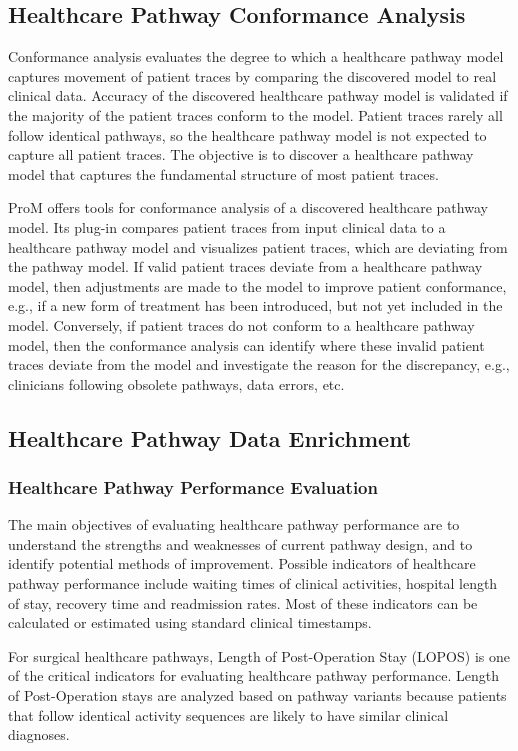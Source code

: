 \subsection{Healthcare Pathway Conformance Analysis}
Conformance analysis evaluates the degree to which a healthcare pathway model captures movement of patient traces by comparing the discovered model to real clinical data. 
Accuracy of the discovered healthcare pathway model is validated if the majority of the patient traces conform to the model. Patient traces rarely all follow identical pathways, so the healthcare pathway model is not expected to capture all patient traces. The objective is to discover a healthcare pathway model that captures the fundamental structure of most patient traces. 

ProM offers tools for conformance analysis of a discovered healthcare pathway model. Its plug-in  compares patient traces from input clinical data to a healthcare pathway model and visualizes patient traces, which are deviating from the pathway model. If valid patient traces deviate from a healthcare pathway model, then adjustments are made to the model to improve patient conformance, e.g., if a new form of treatment has been introduced, but not yet included in the model. Conversely, if patient traces do not conform to a healthcare pathway model, then the conformance analysis can identify where these invalid patient traces deviate from the model and investigate the reason for the discrepancy, e.g., clinicians following obsolete pathways, data errors, etc.

\subsection{Healthcare Pathway Data Enrichment}
\subsubsection{Healthcare Pathway Performance Evaluation}
The main objectives of evaluating healthcare pathway performance are to understand the strengths and weaknesses of current pathway design, and to identify potential methods of improvement. Possible indicators of healthcare pathway performance include waiting times of clinical activities, hospital length of stay, recovery time and readmission rates. Most of these indicators can be calculated or estimated using standard clinical timestamps.

For surgical healthcare pathways, Length of Post-Operation Stay (LOPOS) is one of the critical indicators for evaluating healthcare pathway performance. Length of Post-Operation stays are analyzed based on pathway variants because patients that follow identical activity sequences are likely to have similar clinical diagnoses. 

